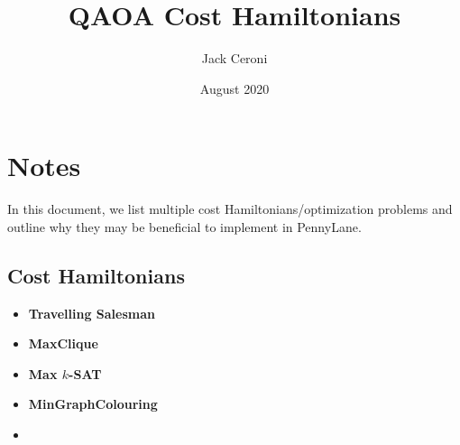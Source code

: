 \documentclass[10pt, oneside]{article}
\title{QAOA Cost Hamiltonians}
\author{Jack Ceroni}
\date{August 2020}
\begin{document}
\maketitle
\tableofcontents

\vspace{.25in}

\section{Notes}

In this document, we list multiple cost Hamiltonians/optimization problems and outline why they 
may be beneficial to implement in PennyLane.

\subsection{Cost Hamiltonians}

\begin{itemize}
	\item \textbf{Travelling Salesman}
	\item \textbf{MaxClique}
	\item \textbf{Max $k$-SAT}
	\item \textbf{MinGraphColouring}
	\item 
\end{itemize}
\end{document}
